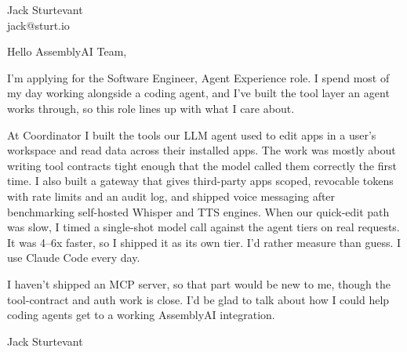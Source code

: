 \documentclass[11pt]{article}
\begin{document}
\raggedright

{\namefont\fontsize{20pt}{24pt}\selectfont Jack Sturtevant}\\[-0.3em]
jack@sturt.io

\vspace{1.2em}

Hello AssemblyAI Team,

I'm applying for the Software Engineer, Agent Experience role. I spend most of my day working alongside a coding agent, and I've built the tool layer an agent works through, so this role lines up with what I care about.

At Coordinator I built the tools our LLM agent used to edit apps in a user's workspace and read data across their installed apps. The work was mostly about writing tool contracts tight enough that the model called them correctly the first time. I also built a gateway that gives third-party apps scoped, revocable tokens with rate limits and an audit log, and shipped voice messaging after benchmarking self-hosted Whisper and TTS engines. When our quick-edit path was slow, I timed a single-shot model call against the agent tiers on real requests. It was 4--6x faster, so I shipped it as its own tier. I'd rather measure than guess. I use Claude Code every day.

I haven't shipped an MCP server, so that part would be new to me, though the tool-contract and auth work is close. I'd be glad to talk about how I could help coding agents get to a working AssemblyAI integration.

\vspace{0.6em}
Jack Sturtevant
\end{document}
